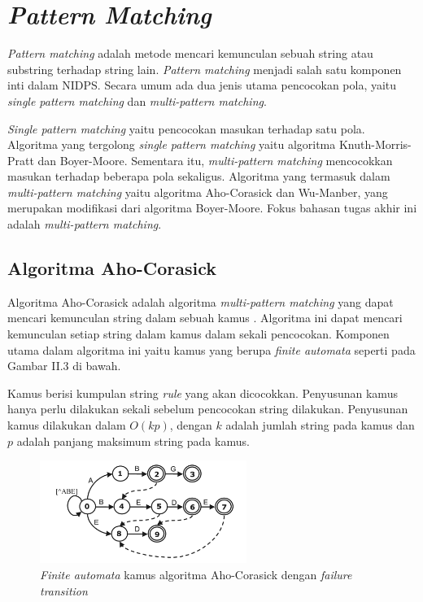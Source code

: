 
\section{\emph{Pattern Matching}}

  \emph{Pattern matching} adalah metode mencari kemunculan sebuah string atau substring terhadap string lain. \emph{Pattern matching} menjadi salah satu komponen inti dalam NIDPS. Secara umum ada dua jenis utama pencocokan pola, yaitu \emph{single pattern matching} dan \emph{multi-pattern matching}. 
  
  \emph{Single pattern matching} yaitu pencocokan masukan terhadap satu pola. Algoritma yang tergolong \emph{single pattern matching} yaitu algoritma Knuth-Morris-Pratt dan Boyer-Moore. Sementara itu, \emph{multi-pattern matching} mencocokkan masukan terhadap beberapa pola sekaligus. Algoritma yang termasuk dalam \emph{multi-pattern matching} yaitu algoritma Aho-Corasick dan Wu-Manber, yang merupakan modifikasi dari algoritma Boyer-Moore. Fokus bahasan tugas akhir ini adalah \emph{multi-pattern matching}.

  \subsection{Algoritma Aho-Corasick}

    Algoritma Aho-Corasick adalah algoritma \emph{multi-pattern matching} yang dapat mencari kemunculan string dalam sebuah kamus \citep{ahoc1975}. Algoritma ini dapat mencari kemunculan setiap string dalam kamus dalam sekali pencocokan. Komponen utama dalam algoritma ini yaitu kamus yang berupa \emph{finite automata} seperti pada Gambar II.3 di bawah. %

    Kamus berisi kumpulan string \emph{rule} yang akan dicocokkan. Penyusunan kamus hanya perlu dilakukan sekali sebelum pencocokan string dilakukan. Penyusunan kamus dilakukan dalam $O(kp)$, dengan $k$ adalah jumlah string pada kamus dan $p$ adalah panjang maksimum string pada kamus.

    \begin{figure}[htb]
      \centering
      \includegraphics[width=0.6\textwidth]{resources/aho-c.png}
      \caption[\emph{Finite automata} kamus algoritma Aho-Corasick dengan \emph{failure transition}]{\emph{Finite automata} kamus algoritma Aho-Corasick dengan \emph{failure transition} \citep{lin2013}}
    \end{figure}

